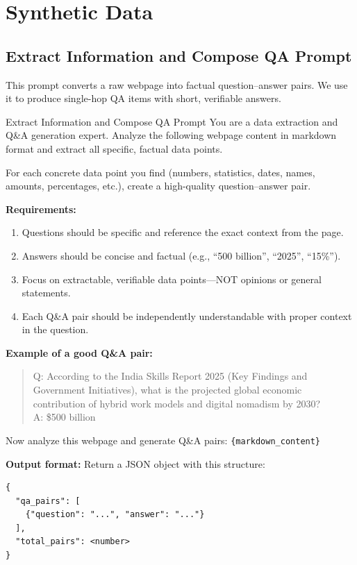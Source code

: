 \documentclass{article} %
\theoremstyle{plain}
\theoremstyle{definition}
\theoremstyle{remark}
\begin{document}
\newpage




\newpage
\appendix

\section{Synthetic Data}
\label{sec:app_synth}

\subsection{Extract Information and Compose QA Prompt}
\label{sec:app_extract_prompt}

This prompt converts a raw webpage into factual question--answer pairs.
We use it to produce single-hop QA items with short, verifiable answers.

\begin{promptbox}{Extract Information and Compose QA Prompt}
You are a data extraction and Q\&A generation expert. Analyze the following webpage content in markdown format and extract all specific, factual data points.

For each concrete data point you find (numbers, statistics, dates, names, amounts, percentages, etc.), create a high-quality question--answer pair.

\textbf{Requirements:}
\begin{enumerate}
    \item Questions should be specific and reference the exact context from the page.
    \item Answers should be concise and factual (e.g., ``500 billion'', ``2025'', ``15\%'').
    \item Focus on extractable, verifiable data points---NOT opinions or general statements.
    \item Each Q\&A pair should be independently understandable with proper context in the question.
\end{enumerate}

\textbf{Example of a good Q\&A pair:}
\begin{quote}\small
Q: According to the India Skills Report 2025 (Key Findings and Government Initiatives), what is the projected global economic contribution of hybrid work models and digital nomadism by 2030?\\
A: \$500 billion
\end{quote}

Now analyze this webpage and generate Q\&A pairs:
\texttt{\{markdown\_content\}}

\textbf{Output format:} Return a JSON object with this structure:
\begin{lstlisting}[basicstyle=\ttfamily\footnotesize,breaklines=true]
{
  "qa_pairs": [
    {"question": "...", "answer": "..."}
  ],
  "total_pairs": <number>
}
\end{lstlisting}
\end{promptbox}
\end{document}
